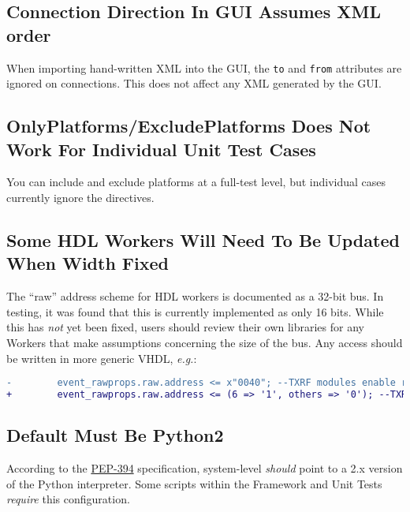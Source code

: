 \subsection{Connection Direction In GUI Assumes XML order} %
\label{bug:2811}
When importing hand-written XML into the GUI, the \texttt{to} and \texttt{from} attributes are ignored on connections. This does not affect any XML generated by the GUI.

\subsection{OnlyPlatforms/ExcludePlatforms Does Not Work For Individual Unit Test Cases} %
\label{bug:4278}
You can include and exclude platforms at a full-test level, but individual cases currently ignore the directives.

\subsection{Some HDL Workers Will Need To Be Updated When  Width Fixed} %
\label{bug:4307}
The ``raw'' address scheme for HDL workers is documented as a 32-bit bus. In testing, it was found that this is currently implemented as only 16 bits. While this has \textit{not} yet been fixed, users should review their own libraries for any Workers that make assumptions concerning the size of the bus. Any  access should be written in more generic VHDL, \textit{e.g.}:
\begin{lstlisting}[language=diff]
-        event_rawprops.raw.address <= x"0040"; --TXRF modules enable register
+        event_rawprops.raw.address <= (6 => '1', others => '0'); --TXRF modules enable register (0x40)
\end{lstlisting}

\subsection{Default  Must Be Python2} %
\label{bug:4526}
According to the \href{https://www.python.org/dev/peps/pep-0394/}{PEP-394} specification, system-level  \textit{should} point to a 2.x version of the Python interpreter. Some scripts within the Framework and Unit Tests \textit{require} this configuration.

